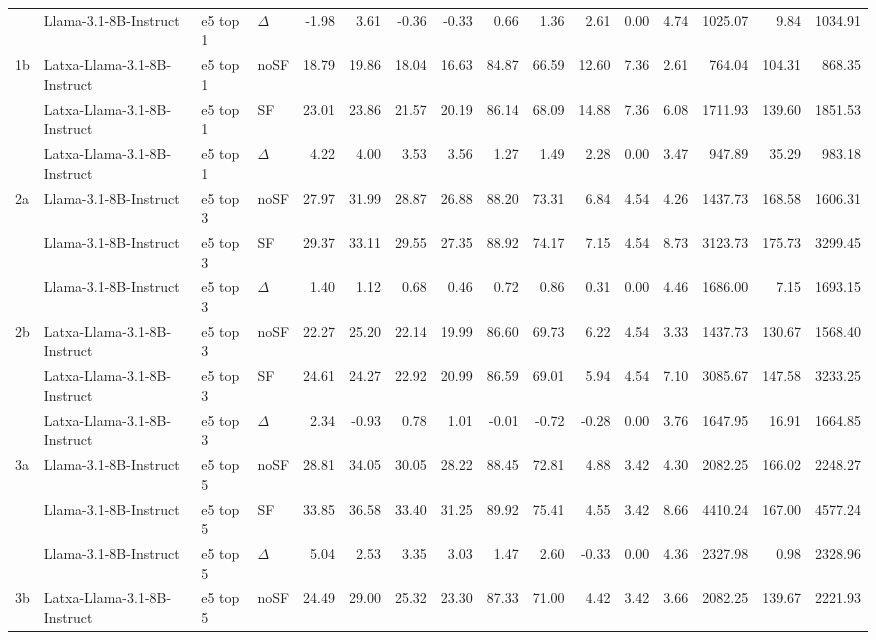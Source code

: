 \begin{landscape}
\begin{footnotesize}
\begin{longtable}{l l l l r r r r r r r r r r r r}
 & Llama-3.1-8B-Instruct & e5 top 1 & $\Delta$ & -1.98 & 3.61 & -0.36 & -0.33 & 0.66 & 1.36 & 2.61 & 0.00 & 4.74 & 1025.07 & 9.84 & 1034.91 \\
1b & Latxa-Llama-3.1-8B-Instruct & e5 top 1 & noSF & 18.79 & 19.86 & 18.04 & 16.63 & 84.87 & 66.59 & 12.60 & 7.36 & 2.61 & 764.04 & 104.31 & 868.35 \\
 & Latxa-Llama-3.1-8B-Instruct & e5 top 1 & SF & 23.01 & 23.86 & 21.57 & 20.19 & 86.14 & 68.09 & 14.88 & 7.36 & 6.08 & 1711.93 & 139.60 & 1851.53 \\
 & Latxa-Llama-3.1-8B-Instruct & e5 top 1 & $\Delta$ & 4.22 & 4.00 & 3.53 & 3.56 & 1.27 & 1.49 & 2.28 & 0.00 & 3.47 & 947.89 & 35.29 & 983.18 \\
\midrule
2a & Llama-3.1-8B-Instruct & e5 top 3 & noSF & 27.97 & 31.99 & 28.87 & 26.88 & 88.20 & 73.31 & 6.84 & 4.54 & 4.26 & 1437.73 & 168.58 & 1606.31 \\
 & Llama-3.1-8B-Instruct & e5 top 3 & SF & 29.37 & 33.11 & 29.55 & 27.35 & 88.92 & 74.17 & 7.15 & 4.54 & 8.73 & 3123.73 & 175.73 & 3299.45 \\
 & Llama-3.1-8B-Instruct & e5 top 3 & $\Delta$ & 1.40 & 1.12 & 0.68 & 0.46 & 0.72 & 0.86 & 0.31 & 0.00 & 4.46 & 1686.00 & 7.15 & 1693.15 \\
2b & Latxa-Llama-3.1-8B-Instruct & e5 top 3 & noSF & 22.27 & 25.20 & 22.14 & 19.99 & 86.60 & 69.73 & 6.22 & 4.54 & 3.33 & 1437.73 & 130.67 & 1568.40 \\
 & Latxa-Llama-3.1-8B-Instruct & e5 top 3 & SF & 24.61 & 24.27 & 22.92 & 20.99 & 86.59 & 69.01 & 5.94 & 4.54 & 7.10 & 3085.67 & 147.58 & 3233.25 \\
 & Latxa-Llama-3.1-8B-Instruct & e5 top 3 & $\Delta$ & 2.34 & -0.93 & 0.78 & 1.01 & -0.01 & -0.72 & -0.28 & 0.00 & 3.76 & 1647.95 & 16.91 & 1664.85 \\
\midrule
3a & Llama-3.1-8B-Instruct & e5 top 5 & noSF & 28.81 & 34.05 & 30.05 & 28.22 & 88.45 & 72.81 & 4.88 & 3.42 & 4.30 & 2082.25 & 166.02 & 2248.27 \\
 & Llama-3.1-8B-Instruct & e5 top 5 & SF & 33.85 & 36.58 & 33.40 & 31.25 & 89.92 & 75.41 & 4.55 & 3.42 & 8.66 & 4410.24 & 167.00 & 4577.24 \\
 & Llama-3.1-8B-Instruct & e5 top 5 & $\Delta$ & 5.04 & 2.53 & 3.35 & 3.03 & 1.47 & 2.60 & -0.33 & 0.00 & 4.36 & 2327.98 & 0.98 & 2328.96 \\
3b & Latxa-Llama-3.1-8B-Instruct & e5 top 5 & noSF & 24.49 & 29.00 & 25.32 & 23.30 & 87.33 & 71.00 & 4.42 & 3.42 & 3.66 & 2082.25 & 139.67 & 2221.93 \\

\end{longtable}
\end{footnotesize}
\end{landscape}
